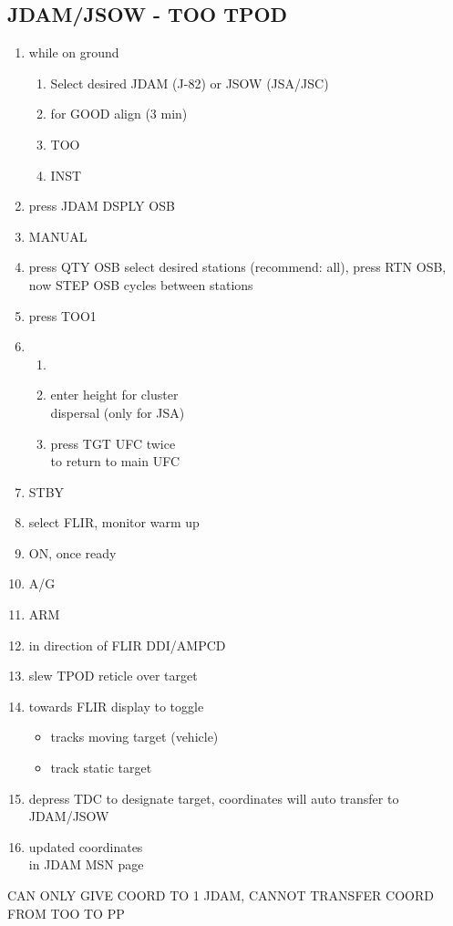 \documentclass[fontHelvetica, widesubsec]{TechCheck}
\begin{document}
	\subsection{JDAM/JSOW - TOO TPOD}
	\thumbnar
	\begin{enumerate}
		\item {}\dotfill while on ground
		\begin{enumerate}
			\item Select desired JDAM (J-82) or JSOW (JSA/JSC)
			\item {}\dotfill for GOOD align (3 min)
			\item {}\dotfill TOO
			\item {}\dotfill INST
		\end{enumerate}
		\item {}\dotfill press JDAM DSPLY OSB
		\item {}\dotfill MANUAL
		\item {}\dotfill press QTY OSB select desired stations (recommend: all), press RTN OSB, now STEP OSB cycles between stations
		\item {}\dotfill press TOO1
		\item {}
		\begin{enumerate}
			\item {}
			\item {}\dotfill enter height for cluster \\ \hfill dispersal (only for JSA)
			\item {}\dotfill press TGT UFC twice \\ \hfill to return to main UFC
		\end{enumerate}
		\item {}\dotfill STBY
		\item {}\dotfill select FLIR, monitor warm up
		\item {}\dotfill ON, once ready
		\item {}\dotfill A/G
		\item {}\dotfill ARM
		\item {}\dotfill in direction of FLIR DDI/AMPCD
		\item {}\dotfill slew TPOD reticle over target
		\item {} towards FLIR display to toggle
		\begin{itemize}
			\item {} tracks moving target (vehicle)
			\item {} track static target
		\end{itemize}
		\item {}\dotfill depress TDC to designate target, coordinates will auto transfer to JDAM/JSOW
		\item {}\dotfill updated coordinates \\ \hfill in JDAM MSN page
	\end{enumerate}
	 CAN ONLY GIVE COORD TO 1 JDAM, CANNOT TRANSFER COORD FROM TOO TO PP
\end{document}
